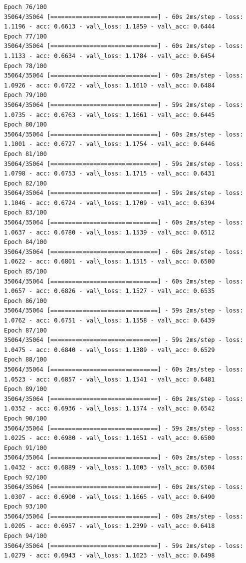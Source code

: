 \documentclass[11pt]{article}
\begin{document}
\begin{Verbatim}[commandchars=\\\{\}]
Epoch 76/100
35064/35064 [==============================] - 60s 2ms/step - loss: 1.1196 - acc: 0.6613 - val\_loss: 1.1859 - val\_acc: 0.6444
Epoch 77/100
35064/35064 [==============================] - 60s 2ms/step - loss: 1.1133 - acc: 0.6634 - val\_loss: 1.1784 - val\_acc: 0.6454
Epoch 78/100
35064/35064 [==============================] - 60s 2ms/step - loss: 1.0926 - acc: 0.6722 - val\_loss: 1.1610 - val\_acc: 0.6484
Epoch 79/100
35064/35064 [==============================] - 59s 2ms/step - loss: 1.0735 - acc: 0.6763 - val\_loss: 1.1661 - val\_acc: 0.6445
Epoch 80/100
35064/35064 [==============================] - 60s 2ms/step - loss: 1.1001 - acc: 0.6727 - val\_loss: 1.1754 - val\_acc: 0.6446
Epoch 81/100
35064/35064 [==============================] - 59s 2ms/step - loss: 1.0798 - acc: 0.6753 - val\_loss: 1.1715 - val\_acc: 0.6431
Epoch 82/100
35064/35064 [==============================] - 59s 2ms/step - loss: 1.1046 - acc: 0.6724 - val\_loss: 1.1709 - val\_acc: 0.6394
Epoch 83/100
35064/35064 [==============================] - 60s 2ms/step - loss: 1.0637 - acc: 0.6780 - val\_loss: 1.1539 - val\_acc: 0.6512
Epoch 84/100
35064/35064 [==============================] - 60s 2ms/step - loss: 1.0622 - acc: 0.6801 - val\_loss: 1.1515 - val\_acc: 0.6500
Epoch 85/100
35064/35064 [==============================] - 60s 2ms/step - loss: 1.0657 - acc: 0.6826 - val\_loss: 1.1527 - val\_acc: 0.6535
Epoch 86/100
35064/35064 [==============================] - 59s 2ms/step - loss: 1.0762 - acc: 0.6751 - val\_loss: 1.1558 - val\_acc: 0.6439
Epoch 87/100
35064/35064 [==============================] - 59s 2ms/step - loss: 1.0475 - acc: 0.6840 - val\_loss: 1.1389 - val\_acc: 0.6529
Epoch 88/100
35064/35064 [==============================] - 60s 2ms/step - loss: 1.0523 - acc: 0.6857 - val\_loss: 1.1541 - val\_acc: 0.6481
Epoch 89/100
35064/35064 [==============================] - 60s 2ms/step - loss: 1.0352 - acc: 0.6936 - val\_loss: 1.1574 - val\_acc: 0.6542
Epoch 90/100
35064/35064 [==============================] - 59s 2ms/step - loss: 1.0225 - acc: 0.6980 - val\_loss: 1.1651 - val\_acc: 0.6500
Epoch 91/100
35064/35064 [==============================] - 60s 2ms/step - loss: 1.0432 - acc: 0.6889 - val\_loss: 1.1603 - val\_acc: 0.6504
Epoch 92/100
35064/35064 [==============================] - 60s 2ms/step - loss: 1.0307 - acc: 0.6900 - val\_loss: 1.1665 - val\_acc: 0.6490
Epoch 93/100
35064/35064 [==============================] - 60s 2ms/step - loss: 1.0205 - acc: 0.6957 - val\_loss: 1.2399 - val\_acc: 0.6418
Epoch 94/100
35064/35064 [==============================] - 59s 2ms/step - loss: 1.0279 - acc: 0.6943 - val\_loss: 1.1623 - val\_acc: 0.6498

\end{Verbatim}
\end{document}
